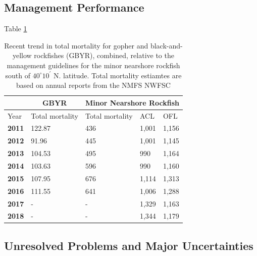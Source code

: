\documentclass[12pt,]{article}
\begin{document}
\FloatBarrier

\subsection*{Management Performance}\label{management-performance}

Table \ref{tab:mnmgt_perform}

\begin{table}[ht]
\centering
\caption{Recent trend in total mortality for gopher and 
                            black-and-yellow rockfishes (GBYR), combined, relative to the 
                             management guidelines for the minor nearshore rockfish 
                             south of $40^\circ 10^\prime$ N. latitude. 
                             Total mortality estiamtes are based on annual reports 
                                from the NMFS NWFSC} 
\label{tab:mnmgt_perform}
\begin{tabular}{lllll}
  \hline
   \multicolumn{1}{c}{} & \multicolumn{1}{c}{GBYR} & \multicolumn{3}{c}{Minor Nearshore Rockfish} \\  \cmidrule(lr){2-2} \cmidrule(lr){3-5}
   \hline
Year & Total mortality & Total mortality & ACL & OFL \\ 
  \hline
\textbf{2011} & 122.87 & 436 & 1,001 & 1,156 \\ 
  \textbf{2012} & 91.96 & 445 & 1,001 & 1,145 \\ 
  \textbf{2013} & 104.53 & 495 & 990 & 1,164 \\ 
  \textbf{2014} & 103.63 & 596 & 990 & 1,160 \\ 
  \textbf{2015} & 107.95 & 676 & 1,114 & 1,313 \\ 
  \textbf{2016} & 111.55 & 641 & 1,006 & 1,288 \\ 
  \textbf{2017} & - & - & 1,329 & 1,163 \\ 
  \textbf{2018} & - & - & 1,344 & 1,179 \\ 
   \hline
   \hline
\end{tabular}
\end{table}

\subsection*{Unresolved Problems and Major
Uncertainties}\label{unresolved-problems-and-major-uncertainties}
\end{document}

